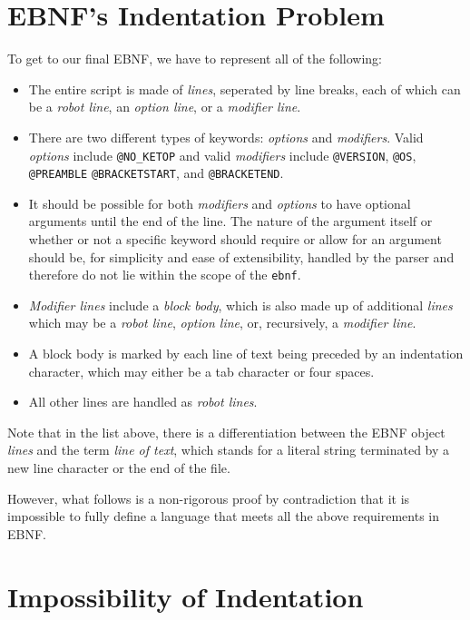 
\section{EBNF's Indentation Problem}

To get to our final EBNF, we have to represent all of the following:

\begin{itemize}
    \item The entire script is made of \textit{lines}, seperated by line breaks, each of which can be a \textit{robot line}, an \textit{option line}, or a \textit{modifier line}. 
    \item There are two different types of keywords: \textit{options} and \textit{modifiers}. Valid \textit{options} include \verb|@NO_KETOP| and valid \textit{modifiers} include \verb|@VERSION|, \verb|@OS|, \verb|@PREAMBLE| \verb|@BRACKETSTART|, and \verb|@BRACKETEND|.
    \item It should be possible for both \textit{modifiers} and \textit{options} to have optional arguments until the end of the line. The nature of the argument itself or whether or not a specific keyword should require or allow for an argument should be, for simplicity and ease of extensibility, handled by the parser and therefore do not lie within the scope of the \verb|ebnf|. 
    \item \textit{Modifier lines} include a \textit{block body}, which is also made up of additional \textit{lines} which may be a \textit{robot line}, \textit{option line}, or, recursively, a \textit{modifier line}. 
    \item A block body is marked by each line of text being preceded by an indentation character, which may either be a tab character or four spaces. 
    \item All other lines are handled as \textit{robot lines}.
\end{itemize}

Note that in the list above, there is a differentiation between the EBNF object \textit{lines} and the term \textit{line of text}, which stands for a literal string terminated by a new line character or the end of the file. 

However, what follows is a non-rigorous proof by contradiction that it is impossible to fully define a language that meets all the above requirements in EBNF.

\section{Impossibility of Indentation}

